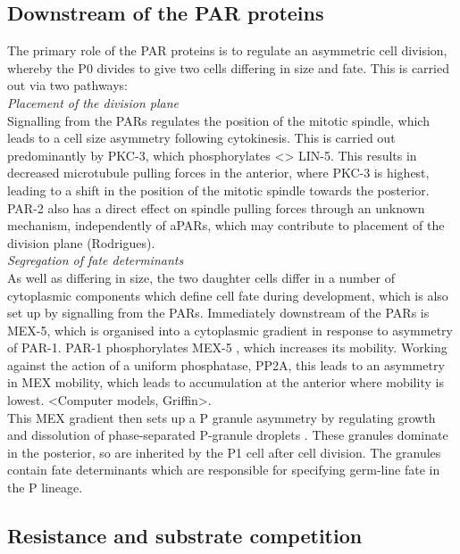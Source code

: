 \documentclass[12pt]{"report"}
\begin{document}
\subsection{Downstream of the PAR proteins}

The primary role of the PAR proteins is to regulate an asymmetric cell division, whereby the P0 divides to give two cells differing in size and fate. This is carried out via two pathways:\\

\textit{Placement of the division plane}\\

Signalling from the PARs regulates the position of the mitotic spindle, which leads to a cell size asymmetry following cytokinesis. This is carried out predominantly by PKC-3, which phosphorylates <> LIN-5. This results in decreased microtubule pulling forces in the anterior, where PKC-3 is highest, leading to a shift in the position of the mitotic spindle towards the posterior. PAR-2 also has a direct effect on spindle pulling forces through an unknown mechanism, independently of aPARs, which may contribute to placement of the division plane (Rodrigues).\\


\textit{Segregation of fate determinants}\\

As well as differing in size, the two daughter cells differ in a number of cytoplasmic components which define cell fate during development, which is also set up by signalling from the PARs. Immediately downstream of the PARs is MEX-5, which is organised into a cytoplasmic gradient in response to asymmetry of PAR-1. PAR-1 phosphorylates MEX-5 \citep{Griffin2011}, which increases its mobility. Working against the action of a uniform phosphatase, PP2A, this leads to an asymmetry in MEX mobility, which leads to accumulation at the anterior where mobility is lowest. <Computer models, Griffin>. \\

This MEX gradient then sets up a P granule asymmetry by regulating growth and dissolution of phase-separated P-granule droplets \citep{Brangwynne2009}. These granules dominate in the posterior, so are inherited by the P1 cell after cell division. The granules contain fate determinants which are responsible for specifying germ-line fate in the P lineage.\\


\subsection{Resistance and substrate competition}
\end{document}
